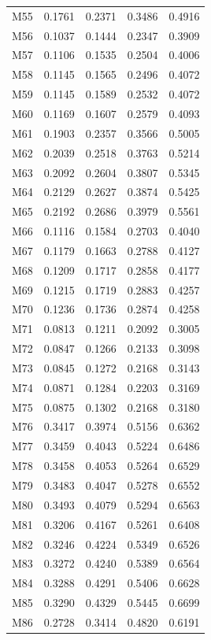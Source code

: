 \begin{longtable}{lrrrr}
M55 & 0.1761 & 0.2371 & 0.3486 & 0.4916 \\
M56 & 0.1037 & 0.1444 & 0.2347 & 0.3909 \\
M57 & 0.1106 & 0.1535 & 0.2504 & 0.4006 \\
M58 & 0.1145 & 0.1565 & 0.2496 & 0.4072 \\
M59 & 0.1145 & 0.1589 & 0.2532 & 0.4072 \\
M60 & 0.1169 & 0.1607 & 0.2579 & 0.4093 \\
M61 & 0.1903 & 0.2357 & 0.3566 & 0.5005 \\
M62 & 0.2039 & 0.2518 & 0.3763 & 0.5214 \\
M63 & 0.2092 & 0.2604 & 0.3807 & 0.5345 \\
M64 & 0.2129 & 0.2627 & 0.3874 & 0.5425 \\
M65 & 0.2192 & 0.2686 & 0.3979 & 0.5561 \\
M66 & 0.1116 & 0.1584 & 0.2703 & 0.4040 \\
M67 & 0.1179 & 0.1663 & 0.2788 & 0.4127 \\
M68 & 0.1209 & 0.1717 & 0.2858 & 0.4177 \\
M69 & 0.1215 & 0.1719 & 0.2883 & 0.4257 \\
M70 & 0.1236 & 0.1736 & 0.2874 & 0.4258 \\
M71 & 0.0813 & 0.1211 & 0.2092 & 0.3005 \\
M72 & 0.0847 & 0.1266 & 0.2133 & 0.3098 \\
M73 & 0.0845 & 0.1272 & 0.2168 & 0.3143 \\
M74 & 0.0871 & 0.1284 & 0.2203 & 0.3169 \\
M75 & 0.0875 & 0.1302 & 0.2168 & 0.3180 \\
M76 & 0.3417 & 0.3974 & 0.5156 & 0.6362 \\
M77 & 0.3459 & 0.4043 & 0.5224 & 0.6486 \\
M78 & 0.3458 & 0.4053 & 0.5264 & 0.6529 \\
M79 & 0.3483 & 0.4047 & 0.5278 & 0.6552 \\
M80 & 0.3493 & 0.4079 & 0.5294 & 0.6563 \\
M81 & 0.3206 & 0.4167 & 0.5261 & 0.6408 \\
M82 & 0.3246 & 0.4224 & 0.5349 & 0.6526 \\
M83 & 0.3272 & 0.4240 & 0.5389 & 0.6564 \\
M84 & 0.3288 & 0.4291 & 0.5406 & 0.6628 \\
M85 & 0.3290 & 0.4329 & 0.5445 & 0.6699 \\
M86 & 0.2728 & 0.3414 & 0.4820 & 0.6191 \\

\end{longtable}
